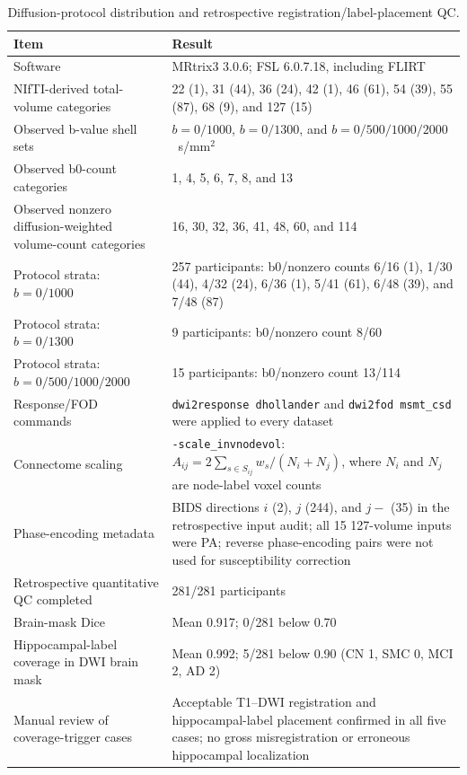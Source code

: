 \documentclass{article}
\begin{document}
\begin{table}[!htbp]
\centering
\caption{Diffusion-protocol distribution and retrospective registration/label-placement QC.}
\label{tab:protocol_qc_summary}
\footnotesize
\begin{tabularx}{\textwidth}{@{}p{}X@{}}
\toprule
Item & Result\\
\midrule
Software & MRtrix3 3.0.6; FSL 6.0.7.18, including FLIRT\\
NIfTI-derived total-volume categories & 22 (1), 31 (44), 36 (24), 42 (1), 46 (61), 54 (39), 55 (87), 68 (9), and 127 (15)\\
Observed b-value shell sets & $b=0/1000$, $b=0/1300$, and $b=0/500/1000/2000$~s/mm$^2$\\
Observed b0-count categories & 1, 4, 5, 6, 7, 8, and 13\\
Observed nonzero diffusion-weighted volume-count categories & 16, 30, 32, 36, 41, 48, 60, and 114\\
Protocol strata: $b=0/1000$ & 257 participants: b0/nonzero counts 6/16 (1), 1/30 (44), 4/32 (24), 6/36 (1), 5/41 (61), 6/48 (39), and 7/48 (87)\\
Protocol strata: $b=0/1300$ & 9 participants: b0/nonzero count 8/60\\
Protocol strata: $b=0/500/1000/2000$ & 15 participants: b0/nonzero count 13/114\\
Response/FOD commands & \texttt{dwi2response dhollander} and \texttt{dwi2fod msmt\_csd} were applied to every dataset\\
Connectome scaling & \texttt{-scale\_invnodevol}: $A_{ij}=2\sum_{s\in S_{ij}}w_s/(N_i+N_j)$, where $N_i$ and $N_j$ are node-label voxel counts\\
Phase-encoding metadata & BIDS directions $i$ (2), $j$ (244), and $j-$ (35) in the retrospective input audit; all 15 127-volume inputs were PA; reverse phase-encoding pairs were not used for susceptibility correction\\
Retrospective quantitative QC completed & 281/281 participants\\
Brain-mask Dice & Mean 0.917; 0/281 below 0.70\\
Hippocampal-label coverage in DWI brain mask & Mean 0.992; 5/281 below 0.90 (CN 1, SMC 0, MCI 2, AD 2)\\
Manual review of coverage-trigger cases & Acceptable T1--DWI registration and hippocampal-label placement confirmed in all five cases; no gross misregistration or erroneous hippocampal localization\\

\end{tabularx}
\end{table}
\end{document}
